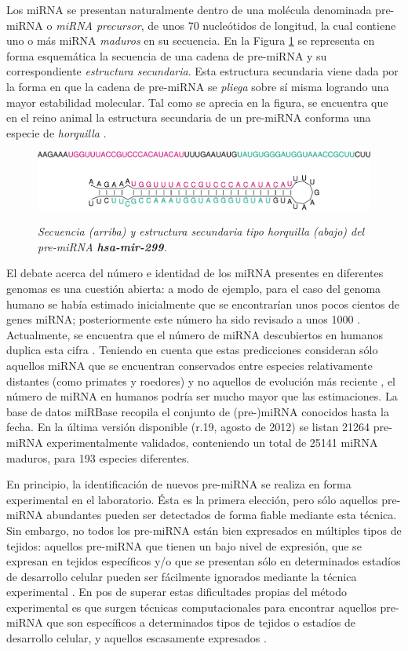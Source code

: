 \documentclass[12pt,bibliography=oldstyle,DIV=12,parskip=half-]{scrreprt}
\begin{document}
Los miRNA se presentan naturalmente dentro de una molécula denominada
pre-miRNA o \emph{miRNA precursor}, de unos 70 nucleótidos de
longitud, la cual contiene uno o más miRNA \emph{maduros} en su
secuencia. En la Figura \ref{horquilla} se representa en forma
esquemática la secuencia de una cadena de pre-miRNA y su
correspondiente \emph{estructura secundaria}. Esta estructura
secundaria viene dada por la forma en que la cadena de pre-miRNA se
\emph{pliega} sobre sí misma logrando una mayor estabilidad
molecular. Tal como se aprecia en la figura, se encuentra que en el
reino animal la estructura secundaria de un pre-miRNA conforma una
especie de \emph{horquilla} \cite{bartel116}\cite{sewer}.
\begin{figure}[H]
\smallskip\small\slshape\center
  \includegraphics[width=.85\textwidth]{res/hsa-mir-299_ss.pdf}
  \caption{\small\slshape Secuencia
    (arriba) y estructura secundaria tipo horquilla (abajo) del
    pre-miRNA \textbf{hsa-mir-299}.  }
  \label{horquilla}
\end{figure}

El debate acerca del número e identidad de los miRNA presentes en
diferentes genomas es una cuestión abierta: a modo de ejemplo, para el
caso del genoma humano se había estimado inicialmente que se
encontrarían unos pocos cientos de genes miRNA; posteriormente este
número ha sido revisado a unos 1000 \cite{sewer}\cite{chang}.
Actualmente, se encuentra que el número de miRNA descubiertos en
humanos duplica esta cifra \cite{gomes}.  Teniendo en cuenta que estas
predicciones consideran sólo aquellos miRNA que se encuentran
conservados entre especies relativamente distantes (como primates y
roedores) y no aquellos de evolución más reciente \cite{sewer}, el
número de miRNA en humanos podría ser mucho mayor que las
estimaciones. La base de datos miRBase \cite{mirbase2}\cite{mirbase3}
recopila el conjunto de (pre-)miRNA conocidos hasta la
fecha. En la última versión disponible (r.19, agosto de 2012) se listan
21264 pre-miRNA experimentalmente validados, conteniendo un total de
25141 miRNA maduros, para 193 especies diferentes.
%

En principio, la identificación de nuevos pre-miRNA se realiza en forma
experimental en el laboratorio. Ésta es la primera elección, pero sólo
aquellos pre-miRNA abundantes pueden ser detectados de forma fiable
mediante esta técnica. Sin embargo, no todos los pre-miRNA están bien
expresados en múltiples tipos de tejidos: aquellos pre-miRNA que tienen un
bajo nivel de expresión, que se expresan en tejidos específicos y/o
que se presentan sólo en determinados estadíos de desarrollo celular
pueden ser fácilmente ignorados mediante la técnica
experimental \cite{ding}\cite{xu}.  En pos de superar estas
dificultades propias del método experimental es que surgen técnicas
computacionales para encontrar aquellos pre-miRNA que son específicos a
determinados tipos de tejidos o estadíos de desarrollo celular, y
aquellos escasamente expresados \cite{sheng}\cite{xu}.
\end{document}
